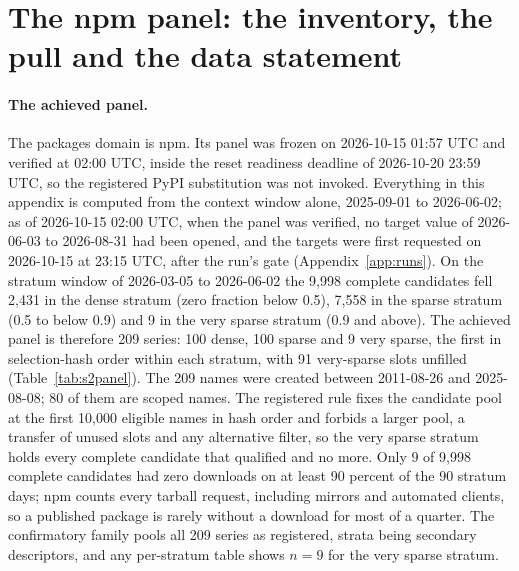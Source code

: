 \providecommand{\qs}{QScore9}

\section{The npm panel: the inventory, the pull and the data statement}
\label{app:s2panel}

\paragraph{The achieved panel.} The packages domain is npm. Its panel was frozen on 2026-10-15 01:57 UTC and
verified at 02:00 UTC, inside the reset readiness deadline of 2026-10-20 23:59 UTC, so the registered PyPI
substitution was not invoked. Everything in this appendix is computed from the context window alone,
2025-09-01 to 2026-06-02; as of 2026-10-15 02:00 UTC, when the panel was verified, no target value of
2026-06-03 to 2026-08-31 had been opened, and the targets were first requested on 2026-10-15 at 23:15 UTC,
after the run's gate (Appendix~\ref{app:runs}). On the stratum window of 2026-03-05 to 2026-06-02 the 9,998
complete candidates fell 2,431 in the dense stratum (zero fraction below 0.5), 7,558 in the sparse stratum
(0.5 to below 0.9) and 9 in the very sparse stratum (0.9 and above). The achieved panel is therefore 209
series: 100 dense, 100 sparse and 9 very sparse, the first in selection-hash order within each stratum, with
91 very-sparse slots unfilled (Table~\ref{tab:s2panel}). The 209 names were created between 2011-08-26 and
2025-08-08; 80 of them are scoped names. The registered rule fixes the candidate pool at the first 10,000
eligible names in hash order and forbids a larger pool, a transfer of unused slots and any alternative
filter, so the very sparse stratum holds every complete candidate that qualified and no more. Only 9 of
9,998 complete candidates had zero downloads on at least 90 percent of the 90 stratum days; npm counts every
tarball request, including mirrors and automated clients, so a published package is rarely without a
download for most of a quarter. The confirmatory family pools all 209 series as registered, strata being
secondary descriptors, and any per-stratum table shows $n = 9$ for the very sparse stratum.

